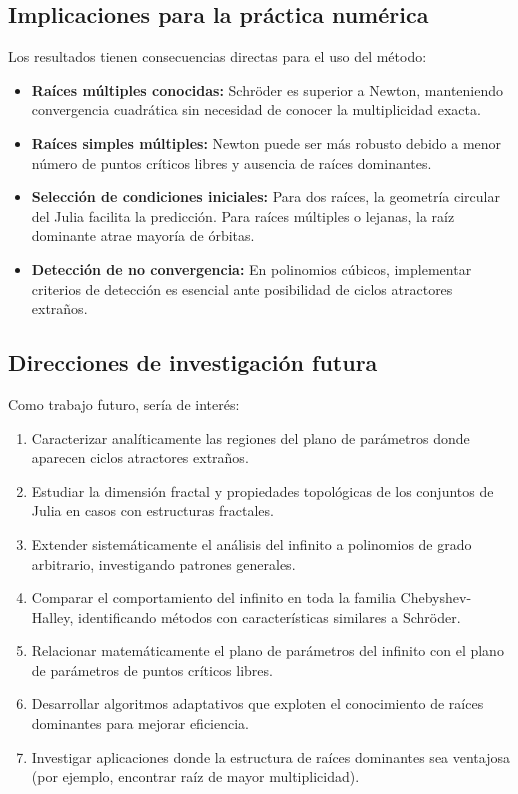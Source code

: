 \subsection{Implicaciones para la práctica numérica}

Los resultados tienen consecuencias directas para el uso del método:

\begin{itemize}
\item \textbf{Raíces múltiples conocidas:} Schröder es superior a Newton, manteniendo convergencia cuadrática sin necesidad de conocer la multiplicidad exacta.

\item \textbf{Raíces simples múltiples:} Newton puede ser más robusto debido a menor número de puntos críticos libres y ausencia de raíces dominantes.

\item \textbf{Selección de condiciones iniciales:} Para dos raíces, la geometría circular del Julia facilita la predicción. Para raíces múltiples o lejanas, la raíz dominante atrae mayoría de órbitas.

\item \textbf{Detección de no convergencia:} En polinomios cúbicos, implementar criterios de detección es esencial ante posibilidad de ciclos atractores extraños.
\end{itemize}

\subsection{Direcciones de investigación futura}

Como trabajo futuro, sería de interés:

\begin{enumerate}
\item Caracterizar analíticamente las regiones del plano de parámetros donde aparecen ciclos atractores extraños.

\item Estudiar la dimensión fractal y propiedades topológicas de los conjuntos de Julia en casos con estructuras fractales.

\item Extender sistemáticamente el análisis del infinito a polinomios de grado arbitrario, investigando patrones generales.

\item Comparar el comportamiento del infinito en toda la familia Chebyshev-Halley, identificando métodos con características similares a Schröder.

\item Relacionar matemáticamente el plano de parámetros del infinito con el plano de parámetros de puntos críticos libres.

\item Desarrollar algoritmos adaptativos que exploten el conocimiento de raíces dominantes para mejorar eficiencia.

\item Investigar aplicaciones donde la estructura de raíces dominantes sea ventajosa (por ejemplo, encontrar raíz de mayor multiplicidad).
\end{enumerate}


